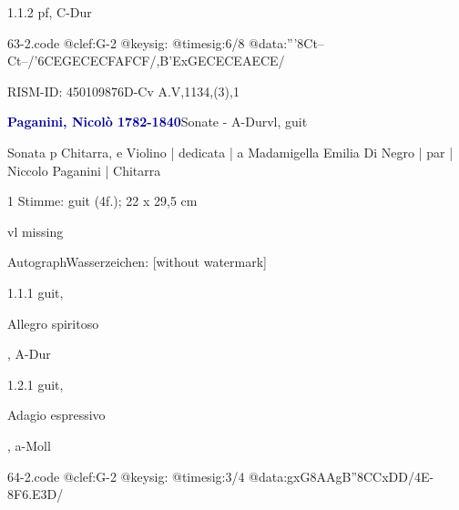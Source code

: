 \documentclass[a4paper, twocolumn, 11pt]{book}
\begin{document}
\newline %
\par 1.1.2  pf, C-Dur  
\begin{filecontents*}{63-2.code}
@clef:G-2
@keysig:
@timesig:6/8
@data:'''8Ct--Ct--/'{6CEGECE}{CFAFCF}/{,B'ExGECE}{CEAECE}/
\end{filecontents*}

\newline %
\par RISM-ID: 450109876\newline D-Cv  A.V,1134,(3),1
\par \vspace{16pt} \textcolor{darkblue}{\textbf{Paganini, Nicolò  1782-1840}}\hfillplus{[64]}\newline Sonate - A-Dur\newline vl, guit
\par \begin{itshape} Sonata p Chitarra, e Violino | dedicata | a Madamigella Emilia Di Negro | par | Niccolo Paganini | Chitarra\end{itshape} 
\par \textcolor{darkblue}{}  1 Stimme: guit  (4f.); 22 x 29,5 cm\newline \begin{small} vl missing\end{small} \newline Autograph\newline Wasserzeichen: [without watermark]
\par 1.1.1  guit, \begin{itshape}Allegro spiritoso\end{itshape}, A-Dur  
\begin{filecontents*}{64-1.code}
@clef:G-2
@keysig:xFCG
@timesig:c
@data:4''A8-{6FE}{8xDEnD'B}/4A--{8.''F6E}/'4B-''4.C'8B}/4B--{8.B''6C}/
\end{filecontents*}

\newline %
\par 1.2.1  guit, \begin{itshape}Adagio espressivo\end{itshape}, a-Moll  
\begin{filecontents*}{64-2.code}
@clef:G-2
@keysig:
@timesig:3/4
@data:gxG{8AA}gB''{8CC}{xDD}/4E-{8F6.E3D}/
\end{filecontents*}
\end{document}
